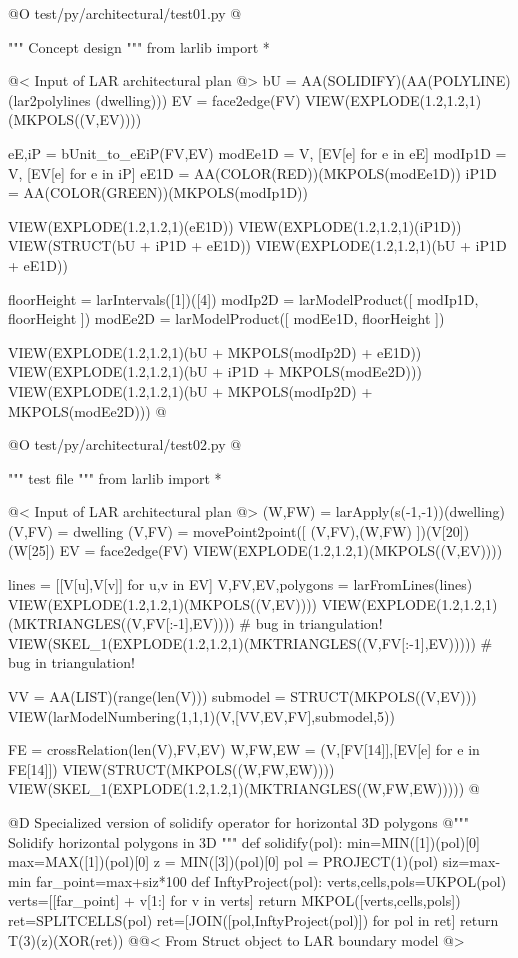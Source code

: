 \documentclass[11pt,oneside]{article}    %
\begin{document}
@O test/py/architectural/test01.py
@{""" Concept design """
from larlib import *

@< Input of LAR architectural plan @>
bU = AA(SOLIDIFY)(AA(POLYLINE)(lar2polylines (dwelling)))
EV = face2edge(FV)
VIEW(EXPLODE(1.2,1.2,1)(MKPOLS((V,EV))))

eE,iP = bUnit_to_eEiP(FV,EV)
modEe1D = V, [EV[e] for e in eE]
modIp1D = V, [EV[e] for e in iP]
eE1D = AA(COLOR(RED))(MKPOLS(modEe1D))
iP1D = AA(COLOR(GREEN))(MKPOLS(modIp1D))

VIEW(EXPLODE(1.2,1.2,1)(eE1D))
VIEW(EXPLODE(1.2,1.2,1)(iP1D))
VIEW(STRUCT(bU + iP1D + eE1D))
VIEW(EXPLODE(1.2,1.2,1)(bU + iP1D + eE1D))

floorHeight = larIntervals([1])([4])
modIp2D = larModelProduct([ modIp1D, floorHeight ])
modEe2D = larModelProduct([ modEe1D, floorHeight ])

VIEW(EXPLODE(1.2,1.2,1)(bU + MKPOLS(modIp2D) + eE1D))
VIEW(EXPLODE(1.2,1.2,1)(bU + iP1D + MKPOLS(modEe2D)))
VIEW(EXPLODE(1.2,1.2,1)(bU + MKPOLS(modIp2D) + MKPOLS(modEe2D)))
@}



@O test/py/architectural/test02.py
@{""" test file """
from larlib import *

@< Input of LAR architectural plan @>
(W,FW) = larApply(s(-1,-1))(dwelling)
(V,FV) = dwelling
(V,FV) = movePoint2point([ (V,FV),(W,FW) ])(V[20])(W[25])
EV = face2edge(FV)
VIEW(EXPLODE(1.2,1.2,1)(MKPOLS((V,EV))))

lines = [[V[u],V[v]] for u,v in EV]
V,FV,EV,polygons = larFromLines(lines)
VIEW(EXPLODE(1.2,1.2,1)(MKPOLS((V,EV))))
VIEW(EXPLODE(1.2,1.2,1)(MKTRIANGLES((V,FV[:-1],EV)))) # bug in triangulation!
VIEW(SKEL_1(EXPLODE(1.2,1.2,1)(MKTRIANGLES((V,FV[:-1],EV))))) # bug in triangulation!

VV = AA(LIST)(range(len(V)))
submodel = STRUCT(MKPOLS((V,EV)))
VIEW(larModelNumbering(1,1,1)(V,[VV,EV,FV],submodel,5))

FE = crossRelation(len(V),FV,EV)
W,FW,EW = (V,[FV[14]],[EV[e] for e in FE[14]])
VIEW(STRUCT(MKPOLS((W,FW,EW))))
VIEW(SKEL_1(EXPLODE(1.2,1.2,1)(MKTRIANGLES((W,FW,EW)))))
@}



@D Specialized version of solidify operator for horizontal 3D polygons
@{""" Solidify horizontal polygons in 3D """
def solidify(pol):    
    min=MIN([1])(pol)[0]
    max=MAX([1])(pol)[0]
    z = MIN([3])(pol)[0]
    pol = PROJECT(1)(pol)
    siz=max-min
    far_point=max+siz*100 
    def InftyProject(pol):
        verts,cells,pols=UKPOL(pol)
        verts=[[far_point] + v[1:] for v in verts]
        return MKPOL([verts,cells,pols])  
    ret=SPLITCELLS(pol)
    ret=[JOIN([pol,InftyProject(pol)]) for pol in ret]
    return T(3)(z)(XOR(ret))
@}@< From Struct object to LAR boundary model @>
\end{document}
